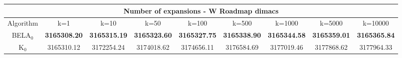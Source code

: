 \begin{tabular}{c|cccccccc}\toprule
\multicolumn{9}{c}{Number of expansions - W Roadmap dimacs}\\ \midrule
Algorithm & k=1 & k=10 & k=50 & k=100 & k=500 & k=1000 & k=5000 & k=10000 \\ \midrule
BELA$_0$ & \textbf{3165308.20} & \textbf{3165315.19} & \textbf{3165323.60} & \textbf{3165327.75} & \textbf{3165338.90} & \textbf{3165344.58} & \textbf{3165359.01} & \textbf{3165365.84} \\
K$_0$ & 3165310.12 & 3172254.24 & 3174018.62 & 3174656.11 & 3176584.69 & 3177019.46 & 3177868.62 & 3177964.33 \\ \bottomrule 
\end{tabular}
